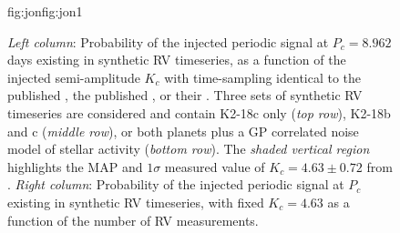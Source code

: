 \begin{figure}
\begin{ocg}{fig:jon}{fig:jon}{1}
  \end{ocg}
  \hspace{-0.8\hsize}%
  \caption[The effect of sampling on the probability of the periodic signal at $P_c=8.962$ days in synthetic RV timeseries.]{\small
    \emph{Left column}: Probability of the injected periodic signal at $P_c=8.962$ days existing 
    in synthetic RV timeseries, as a function of the injected semi-amplitude $K_c$ with time-sampling
    identical to the published  ,
    the published  , or their
    . Three sets of synthetic
    RV timeseries are considered and contain K2-18c only (\emph{top row}), K2-18b and c (\emph{middle row}),
    or both planets plus a GP correlated noise model of stellar activity (\emph{bottom row}). The
    \emph{shaded vertical region} highlights the MAP and $1\sigma$ measured value of $K_c=4.63 \pm 0.72$ \mps{}
    from .
    \emph{Right column}: Probability of the injected periodic signal at $P_c$ existing
    in synthetic RV timeseries, with fixed $K_c=4.63$ \mps{,} as a function of the number of RV measurements.}
  \label{k2182fig:9vKcNrv}
\end{figure}

